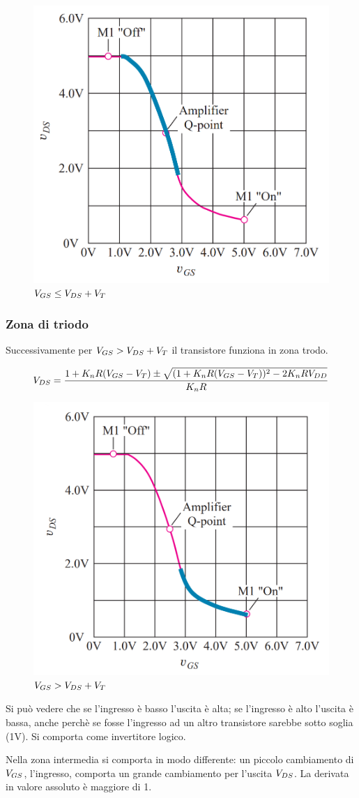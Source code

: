 \begin{figure}[htbp]
    \centering
    \includegraphics[width=0.4\linewidth]{img/IO_ampl.png}
    \caption{$V_{GS} \leq V_{DS} + V_{T}$}    
\end{figure}


\subsubsection{Zona di triodo}

Successivamente per $V_{GS} > V_{DS} + V_{T}$ il transistore funziona in zona trodo.

\begin{equation*}
    V_{DS} = \frac{1+K_nR(V_{GS} - V_{T} ) \pm \sqrt{(1 + K_nR(V_{GS} - V_{T}))^2 - 2K_nRV_{DD}}  }{K_nR}
\end{equation*}

\begin{figure}[htbp]
    \centering
    \includegraphics[width=0.4\linewidth]{img/IO_triodo.png}
    \caption{$V_{GS} > V_{DS} + V_{T}$}    
\end{figure}

Si può vedere che se l'ingresso è basso l'uscita è alta; se l'ingresso è alto l'uscita è bassa, anche perchè se fosse l'ingresso ad un altro transistore sarebbe sotto soglia (1V). Si comporta come invertitore logico.

Nella zona intermedia si comporta in modo differente: un piccolo cambiamento di $V_{GS}$, l'ingresso, comporta un grande cambiamento per l'uscita $V_{DS}$. La derivata in valore assoluto è maggiore di 1.


